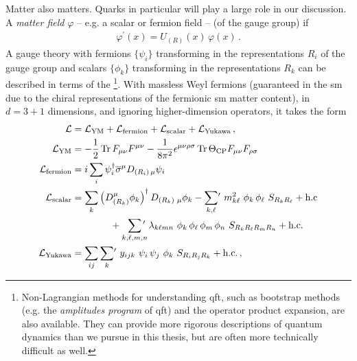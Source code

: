Matter also matters.
%
Quarks in particular will play a large role in our discussion.
%
A \textit{matter field} \(\varphi\) -- e.g. a scalar or fermion field --  (of the gauge group) if
\begin{align}
    \varphi^\prime(x) = U_{(R)}(x) \, \varphi(x)
    \,.
\end{align}
%
A gauge theory with fermions \(\{\psi_{i}\}\) transforming in the representations \(R_i\) of the gauge group and scalars \(\{\phi_k\}\) transforming in the representations \(R_k\) can be described in terms of the %
\footnote{
    Non-Lagrangian methods for understanding \gls{qft}, such as bootstrap methods (e.g. the \textit{amplitudes program} of \gls{qft}) and the operator product expansion, are also available.
    They can provide more rigorous descriptions of quantum dynamics than we pursue in this thesis, but are often more technically difficult as well.
}.
%
With massless Weyl fermions (guaranteed in the \gls{sm} due to the chiral representations of the fermionic \gls{sm} matter content), in \(d=3+1\) dimensions, and ignoring higher-dimension operators, it takes the form
\begin{subequations}
    \label{eq:yang-mills-matter-lagrangian}
\begin{align}
    \mathcal{L}
    &=
    \mathcal{L}_\text{YM}
    +
    \mathcal{L}_\text{fermion}
    +
    \mathcal{L}_\text{scalar}
    +
    \mathcal{L}_\text{Yukawa}
    \,,
    \\
    \mathcal{L}_\text{YM}
    &=
    -
    \frac{1}{2} \Tr F_{\mu\nu} F^{\mu\nu}
    -
    \frac{1}{8 \pi^2}
    \epsilon^{\mu\nu\rho\sigma}
    \Tr
        \Theta_\text{CP}
        F_{\mu\nu}
        F_{\rho\sigma}
    \,
    \\
    \mathcal{L}_\text{fermion}
    &=
    i \sum_i \psi_i^\dagger \overline{\sigma}^\mu D_{(R_i)\,\mu} \psi_i
    \\
    \mathcal{L}_\text{scalar}
    &=
    \sum_k \left(D_{(R_k)}^\mu \phi_k\right)^\dagger D_{(R_k)\,\,\mu} \phi_k
    -
    \sum_{k,\ell} \! {}^\prime
    \,\,
    m_{k\ell}^2
    \,\,
    \phi_k \, \phi_\ell
    \,\,
    S_{R_k R_\ell}
    +
    \text{h.c}
    \\
    \notag
    &\qquad\qquad
    +
    \sum_{k,\ell,m,n} \!\!\!\! {}^\prime
    \,\,
    \lambda_{k\ell m n}
    \,\,
    \phi_k \, \phi_\ell \, \phi_m \, \phi_n
    \,\,
    S_{R_k R_\ell R_m R_n}
    +
    \text{h.c.}
    \\
    \mathcal{L}_\text{Yukawa}
    &=
    \sum_{ij}
    \sum_{k} \! {}^\prime
    \,\,
    y_{ijk}
    \,\,
    \psi_i \,\psi_j \,\, \phi_k
    \,\,
    S_{R_i R_j R_k}
    +
    \text{h.c.}
    \,,
\end{align}
\end{subequations}
